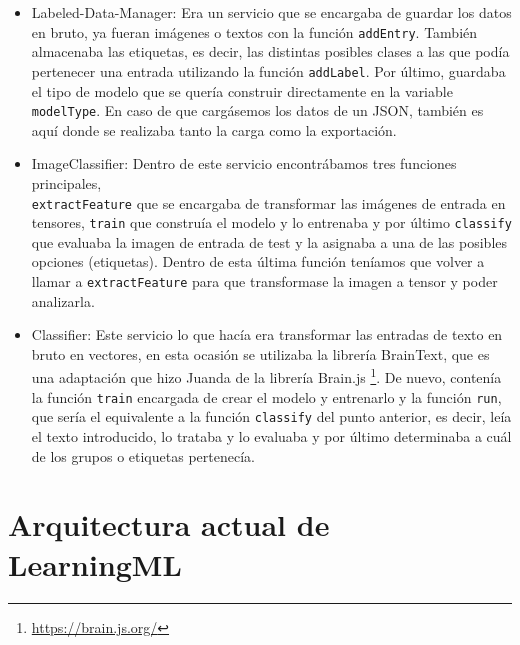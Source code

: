 \documentclass[a4paper, 12pt]{book}
\begin{document}
\begin{itemize}
  
	\item Labeled-Data-Manager: Era un servicio que se encargaba de guardar los datos en bruto, ya fueran imágenes o textos con la función \texttt{addEntry}. También almacenaba las etiquetas, es decir, las distintas posibles clases a las que podía pertenecer una entrada utilizando la función \texttt{addLabel}. Por último, guardaba el tipo de modelo que se quería construir directamente en la variable \texttt{modelType}. En caso de que cargásemos los datos de un JSON, también es aquí donde se realizaba tanto la carga como la exportación.
 
	\item ImageClassifier: Dentro de este servicio encontrábamos tres funciones principales, \\ \texttt{extractFeature} que se encargaba de transformar las imágenes de entrada en tensores, \texttt{train} que construía el modelo y lo entrenaba y por último \texttt{classify} que evaluaba la imagen de entrada de test y la asignaba a una de las posibles opciones (etiquetas). Dentro de esta última función teníamos que volver a llamar a \texttt{extractFeature} para que transformase la imagen a tensor y poder analizarla.

	\item Classifier: Este servicio lo que hacía era transformar las entradas de texto en bruto en vectores, en esta ocasión se utilizaba la librería BrainText, que es una adaptación que hizo Juanda de la librería Brain.js \footnote{\url{https://brain.js.org/}}. De nuevo, contenía la función \texttt{train} encargada de crear el modelo y entrenarlo y la función \texttt{run}, que sería el equivalente a la función  \texttt{classify} del punto anterior, es decir, leía el texto introducido, lo trataba y lo evaluaba y por último determinaba a cuál de los grupos o etiquetas pertenecía.

\end{itemize}

\section{Arquitectura actual de LearningML} 
\label{sec:arquitecturaactual}
\end{document}

